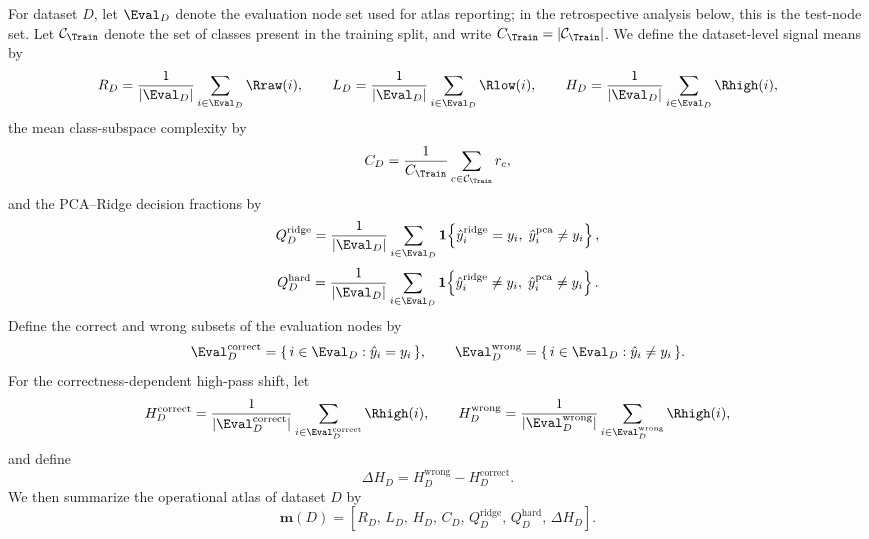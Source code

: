 For dataset $D$, let $\Eval_D$ denote the evaluation node set used for atlas
reporting; in the retrospective analysis below, this is the test-node set.
Let $\mathcal{C}_{\Train}$ denote the set of classes present in the training
split, and write $C_{\Train}=|\mathcal{C}_{\Train}|$. We define the
dataset-level signal means by
\begin{equation}
R_D
=
\frac{1}{|\Eval_D|}
\sum_{i\in\Eval_D}\Rraw(i),
\qquad
L_D
=
\frac{1}{|\Eval_D|}
\sum_{i\in\Eval_D}\Rlow(i),
\qquad
H_D
=
\frac{1}{|\Eval_D|}
\sum_{i\in\Eval_D}\Rhigh(i),
\label{eq:dataset-signal-means}
\end{equation}
the mean class-subspace complexity by
\begin{equation}
C_D
=
\frac{1}{C_{\Train}}
\sum_{c\in\mathcal{C}_{\Train}} r_c,
\label{eq:dataset-complexity}
\end{equation}
and the PCA--Ridge decision fractions by
\begin{equation}
Q^{\mathrm{ridge}}_D
=
\frac{1}{|\Eval_D|}
\sum_{i\in\Eval_D}
\mathbf{1}\!\left\{
\hat y_i^{\mathrm{ridge}}=y_i,\;
\hat y_i^{\mathrm{pca}}\neq y_i
\right\},
\label{eq:ridge-only-fraction}
\end{equation}
\begin{equation}
Q^{\mathrm{hard}}_D
=
\frac{1}{|\Eval_D|}
\sum_{i\in\Eval_D}
\mathbf{1}\!\left\{
\hat y_i^{\mathrm{ridge}}\neq y_i,\;
\hat y_i^{\mathrm{pca}}\neq y_i
\right\}.
\label{eq:hard-fraction}
\end{equation}
Define the correct and wrong subsets of the evaluation nodes by
\begin{equation}
\Eval_D^{\mathrm{correct}}
=
\{\,i\in\Eval_D:\hat y_i=y_i\,\},
\qquad
\Eval_D^{\mathrm{wrong}}
=
\{\,i\in\Eval_D:\hat y_i\neq y_i\,\}.
\label{eq:correct-wrong-sets}
\end{equation}
For the correctness-dependent high-pass shift, let
\begin{equation}
H_D^{\mathrm{correct}}
=
\frac{1}{|\Eval_D^{\mathrm{correct}}|}
\sum_{i\in\Eval_D^{\mathrm{correct}}}\Rhigh(i),
\qquad
H_D^{\mathrm{wrong}}
=
\frac{1}{|\Eval_D^{\mathrm{wrong}}|}
\sum_{i\in\Eval_D^{\mathrm{wrong}}}\Rhigh(i),
\label{eq:correct-wrong-high}
\end{equation}
and define
\begin{equation}
\Delta H_D
=
H_D^{\mathrm{wrong}}
-
H_D^{\mathrm{correct}}.
\label{eq:highpass-shift}
\end{equation}
We then summarize the operational atlas of dataset $D$ by
\begin{equation}
\mathbf{m}(D)
=
\left[
R_D,\,
L_D,\,
H_D,\,
C_D,\,
Q^{\mathrm{ridge}}_D,\,
Q^{\mathrm{hard}}_D,\,
\Delta H_D
\right].
\label{eq:atlas-fingerprint}
\end{equation}

